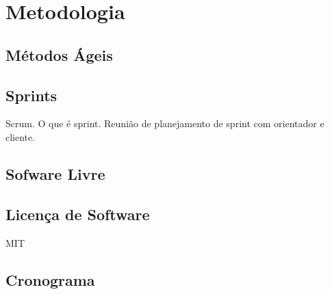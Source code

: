 \chapter{Metodologia}

\section{Métodos Ágeis}

\section{Sprints}
Scrum.
O que é sprint.
Reunião de planejamento de sprint com orientador e cliente.

\section{Sofware Livre}

\section{Licença de Software}
MIT

\section{Cronograma}
